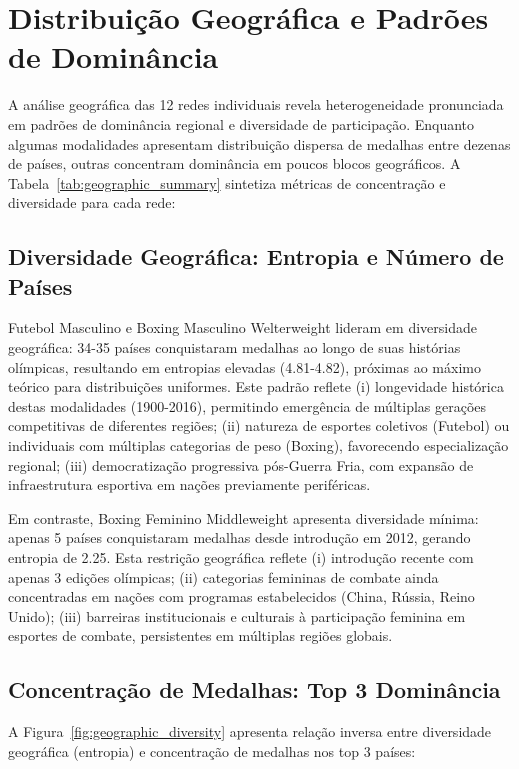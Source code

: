 \section{Distribuição Geográfica e Padrões de Dominância}

A análise geográfica das 12 redes individuais revela heterogeneidade pronunciada em padrões de dominância regional e diversidade de participação. Enquanto algumas modalidades apresentam distribuição dispersa de medalhas entre dezenas de países, outras concentram dominância em poucos blocos geográficos. A Tabela~\ref{tab:geographic_summary} sintetiza métricas de concentração e diversidade para cada rede:



\subsection{Diversidade Geográfica: Entropia e Número de Países}

Futebol Masculino e Boxing Masculino Welterweight lideram em diversidade geográfica: 34-35 países conquistaram medalhas ao longo de suas histórias olímpicas, resultando em entropias elevadas (4.81-4.82), próximas ao máximo teórico para distribuições uniformes. Este padrão reflete (i) longevidade histórica destas modalidades (1900-2016), permitindo emergência de múltiplas gerações competitivas de diferentes regiões; (ii) natureza de esportes coletivos (Futebol) ou individuais com múltiplas categorias de peso (Boxing), favorecendo especialização regional; (iii) democratização progressiva pós-Guerra Fria, com expansão de infraestrutura esportiva em nações previamente periféricas.

Em contraste, Boxing Feminino Middleweight apresenta diversidade mínima: apenas 5 países conquistaram medalhas desde introdução em 2012, gerando entropia de 2.25. Esta restrição geográfica reflete (i) introdução recente com apenas 3 edições olímpicas; (ii) categorias femininas de combate ainda concentradas em nações com programas estabelecidos (China, Rússia, Reino Unido); (iii) barreiras institucionais e culturais à participação feminina em esportes de combate, persistentes em múltiplas regiões globais.

\subsection{Concentração de Medalhas: Top 3 Dominância}

A Figura~\ref{fig:geographic_diversity} apresenta relação inversa entre diversidade geográfica (entropia) e concentração de medalhas nos top 3 países:

